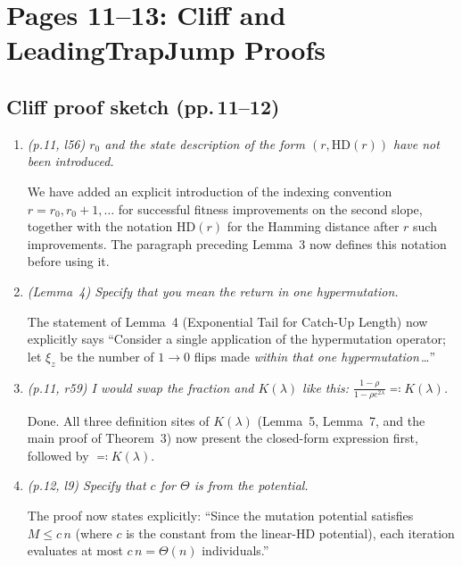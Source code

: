 \documentclass[11pt]{article}
\newcommand{\RC}[1]{\textcolor{revcolor}{\textit{#1}}}
\newcommand{\resp}[1]{\smallskip\noindent #1\medskip}
\begin{document}
\section*{Pages 11--13: Cliff and LeadingTrapJump Proofs}


\subsection*{Cliff proof sketch (pp.\,11--12)}

\begin{enumerate}[label=\textbf{C\arabic*.},leftmargin=*]

\item \RC{(p.11, l56) $r_0$ and the state description of the form
$(r, \mathrm{HD}(r))$ have not been introduced.}

\resp{We have added an explicit introduction of the indexing convention
$r = r_0, r_0+1, \dots$ for successful fitness improvements on the second
slope, together with the notation $\mathrm{HD}(r)$ for the Hamming distance
after $r$ such improvements. The paragraph preceding
Lemma~3 now defines this notation before using it.}

\item \RC{(Lemma~4) Specify that you mean the return in one hypermutation.}

\resp{The statement of Lemma~4 (Exponential Tail for Catch-Up Length) now
explicitly says ``Consider a single application of the hypermutation operator;
let $\xi_z$ be the number of $1\!\to\!0$ flips made \emph{within that one
hypermutation}\,\ldots''}

\item \RC{(p.11, r59) I would swap the fraction and $K(\lambda)$ like this:
$\frac{1-\rho}{1-\rho e^{2\lambda}} \eqqcolon K(\lambda)$.}

\resp{Done. All three definition sites of $K(\lambda)$ (Lemma~5, Lemma~7, and
the main proof of Theorem~3) now present the closed-form expression first,
followed by $\eqqcolon K(\lambda)$.}

\item \RC{(p.12, l9) Specify that $c$ for $\Theta$ is from the potential.}

\resp{The proof now states explicitly: ``Since the mutation potential satisfies
$M \le c\,n$ (where $c$ is the constant from the linear-HD potential), each
iteration evaluates at most $c\,n = \Theta(n)$ individuals.''}


\end{enumerate}
\end{document}
